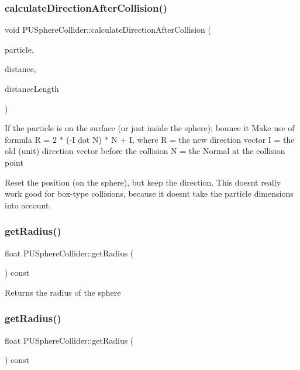 \subsubsection{\texorpdfstring{calculate\+Direction\+After\+Collision()}{calculateDirectionAfterCollision()}}
{\footnotesize\ttfamily void P\+U\+Sphere\+Collider\+::calculate\+Direction\+After\+Collision (\begin{DoxyParamCaption}\item[{\hyperlink{structPUParticle3D}{P\+U\+Particle3D} $\ast$}]{particle,  }\item[{\hyperlink{classVec3}{Vec3}}]{distance,  }\item[{float}]{distance\+Length }\end{DoxyParamCaption})}

If the particle is on the surface (or just inside the sphere); bounce it Make use of formula R = 2 $\ast$ (-\/I dot N) $\ast$ N + I, where R = the new direction vector I = the old (unit) direction vector before the collision N = the Normal at the collision point

Reset the position (on the sphere), but keep the direction. This doesn\textquotesingle{}t really work good for box-\/type collisions, because it doesn\textquotesingle{}t take the particle dimensions into account.\mbox{\label{classPUSphereCollider_af2a9f80cc6cf89766a41d7244f9fe3e2}} 
\subsubsection{\texorpdfstring{get\+Radius()}{getRadius()}\hspace{0.1cm}{\footnotesize\ttfamily [1/2]}}
{\footnotesize\ttfamily float P\+U\+Sphere\+Collider\+::get\+Radius (\begin{DoxyParamCaption}\item[{void}]{ }\end{DoxyParamCaption}) const}

Returns the radius of the sphere \mbox{\label{classPUSphereCollider_af2a9f80cc6cf89766a41d7244f9fe3e2}} 
\subsubsection{\texorpdfstring{get\+Radius()}{getRadius()}\hspace{0.1cm}{\footnotesize\ttfamily [2/2]}}
{\footnotesize\ttfamily float P\+U\+Sphere\+Collider\+::get\+Radius (\begin{DoxyParamCaption}{ }\end{DoxyParamCaption}) const}

